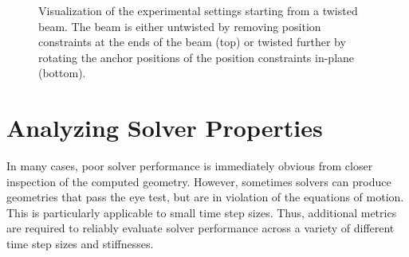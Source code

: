 \begin{figure}[h]
    \centering
    \caption{Visualization of the experimental settings starting from a twisted beam. The beam is either untwisted by removing position constraints at the 
    ends of the beam (top) or twisted further by rotating the anchor positions of the position constraints in-plane (bottom).}
    \label{fig:twisting-beam-setup}
\end{figure}

\section{Analyzing Solver Properties}\label{ss:analysis-solvers}
In many cases, poor solver performance is immediately obvious from closer inspection of the computed geometry. However, sometimes solvers can produce geometries 
that pass the eye test, but are in violation of the equations of motion. This is particularly applicable to small time step sizes. Thus, additional metrics are 
required to reliably evaluate solver performance across a variety of different time step sizes and stiffnesses. 

